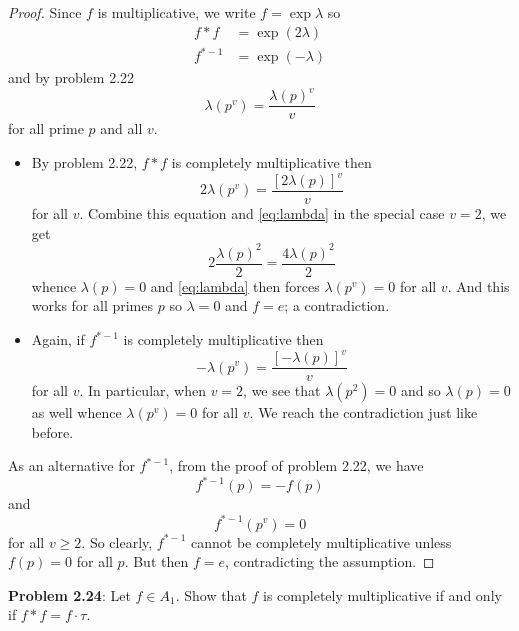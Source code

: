 \documentclass{article}
\begin{document}
\begin{proof}
Since $f$ is multiplicative, we write $f = \exp \lambda$ so
\begin{align*}
f * f &= \exp (2 \lambda)\\
f^{*-1} &= \exp (-\lambda)
\end{align*}
and by problem 2.22
\begin{equation}
\lambda(p^v) = \frac{\lambda(p)^v}{v}
\label{eq:lambda}
\end{equation}
for all prime $p$ and all $v$.

\begin{itemize}
\item By problem 2.22, $f * f$ is completely multiplicative then
$$2\lambda(p^v) = \frac{[2\lambda(p)]^v}{v}$$
for all $v$. Combine this equation and \eqref{eq:lambda} in the special case $v = 2$, we get
$$2\frac{\lambda(p)^2}{2} = \frac{4\lambda(p)^2}{2}$$
whence $\lambda(p) = 0$ and \eqref{eq:lambda} then forces $\lambda(p^v) = 0$ for all $v$. And this works for all primes $p$ so $\lambda = 0$ and $f = e$; a contradiction.

\item Again, if $f^{*-1}$ is completely multiplicative then
$$-\lambda(p^v) = \frac{[-\lambda(p)]^v}{v}$$
for all $v$.
In particular, when $v = 2$, we see that $\lambda(p^2) = 0$ and so $\lambda(p) = 0$ as well whence $\lambda(p^v) = 0$ for all $v$. We reach the contradiction just like before.
\end{itemize}

As an alternative for $f^{*-1}$, from the proof of problem 2.22, we have
$$f^{*-1}(p) = -f(p)$$
and
$$f^{*-1}(p^v) = 0$$
for all $v \geq 2$. So clearly, $f^{*-1}$ cannot be completely multiplicative unless $f(p) = 0$ for all $p$. But then $f = e$, contradicting the assumption.
\end{proof}

\textbf{Problem 2.24}: Let $f \in A_1$. Show that $f$ is completely multiplicative if and only if $f * f = f \cdot \tau$.
\end{document}

